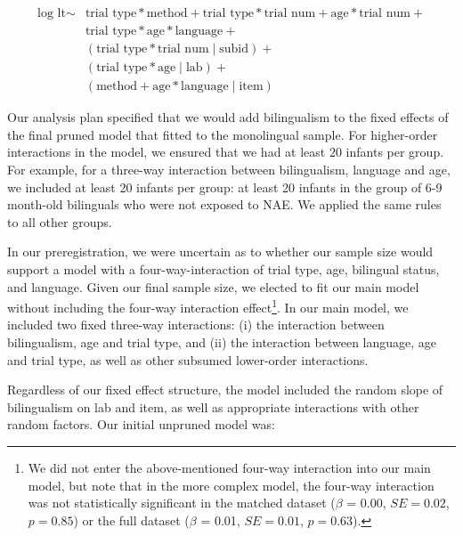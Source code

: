 \documentclass[
  english,
  ,man,floatsintext]{apa6}
\begin{document}
\begin{equation}
\begin{split}
\text{log lt} \sim & \text{trial type} * \text{method} + \text{trial type} * \text{trial num} + \text{age} * \text{trial num} + \\
& \text{trial type} * \text{age} * \text{language} + \\
& (\text{trial type} * \text{trial num} \mid \text{subid}) + \\
& (\text{trial type} * \text{age} \mid \text{lab}) + \\
& (\text{method} + \text{age} * \text{language} \mid \text{item})
\end{split}
\end{equation}

Our analysis plan specified that we would add bilingualism to the fixed effects of the final pruned model that fitted to the monolingual sample. For higher-order interactions in the model, we ensured that we had at least 20 infants per group. For example, for a three-way interaction between bilingualism, language and age, we included at least 20 infants per group: at least 20 infants in the group of 6-9 month-old bilinguals who were not exposed to NAE. We applied the same rules to all other groups.

In our preregistration, we were uncertain as to whether our sample size would support a model with a four-way-interaction of trial type, age, bilingual status, and language. Given our final sample size, we elected to fit our main model without including the four-way interaction effect\footnote{We did not enter the above-mentioned four-way interaction into our main model, but note that in the more complex model, the four-way interaction was not statistically significant in the matched dataset ($\beta$ = 0.00, $SE = 0.02$, $p = 0.85$) or the full dataset ($\beta$ = 0.01, $SE = 0.01$, $p = 0.63$).}. In our main model, we included two fixed three-way interactions: (i) the interaction between bilingualism, age and trial type, and (ii) the interaction between language, age and trial type, as well as other subsumed lower-order interactions.

Regardless of our fixed effect structure, the model included the random slope of bilingualism on lab and item, as well as appropriate interactions with other random factors. Our initial unpruned model was:
\end{document}
